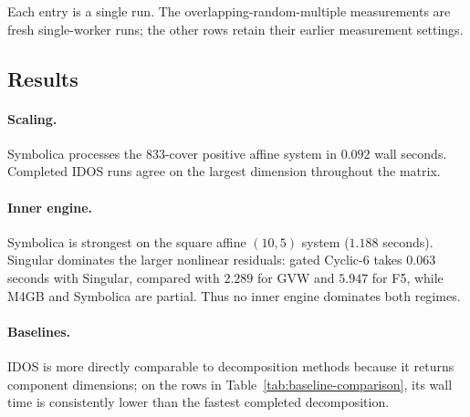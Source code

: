 \documentclass[12pt]{article}
\begin{document}
Each entry is a single run.  The overlapping-random-multiple measurements are
fresh single-worker runs; the other rows retain their earlier measurement
settings.

\subsection*{Results}

\paragraph{Scaling.}
Symbolica processes the 833-cover positive affine system in $0.092$ wall
seconds.  Completed IDOS runs agree on the largest dimension throughout the
matrix.

\paragraph{Inner engine.}
Symbolica is strongest on the square affine $(10,5)$ system ($1.188$
seconds).  Singular dominates the larger nonlinear residuals: gated Cyclic-6
takes $0.063$ seconds with Singular, compared with $2.289$ for GVW and $5.947$
for F5, while M4GB and Symbolica are partial.  Thus no inner engine dominates
both regimes.

\paragraph{Baselines.}
IDOS is more directly comparable to decomposition methods because it returns
component dimensions; on the rows in Table~\ref{tab:baseline-comparison},
its wall time is consistently lower than the fastest completed decomposition.
\end{document}
